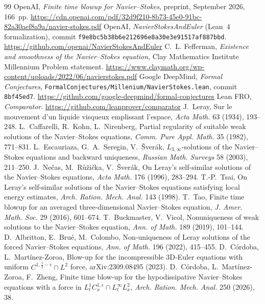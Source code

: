 \documentclass[11pt]{article}
\theoremstyle{plain}
\theoremstyle{remark}
\begin{document}
\begin{thebibliography}{99}\small
{} OpenAI, \emph{Finite time blowup for Navier--Stokes}, preprint, September 2026, 166~pp. \url{https://cdn.openai.com/pdf/32d9f210-8b73-45e0-91bc-82a30aef8a9a/navier-stokes.pdf}
 OpenAI, \emph{NavierStokesAndEuler} (Lean~4 formalization), commit \texttt{f9e8bc5b38b6e212696e8a30e3e91517af887bbd}. \url{https://github.com/openai/NavierStokesAndEuler}
 C.~L. Fefferman, \emph{Existence and smoothness of the Navier--Stokes equation}, Clay Mathematics Institute Millennium Problem statement. \url{https://www.claymath.org/wp-content/uploads/2022/06/navierstokes.pdf}
 Google DeepMind, \emph{Formal Conjectures}, \texttt{FormalConjectures/Millenium/NavierStokes.lean}, commit \texttt{8bf45ed7}. \url{https://github.com/google-deepmind/formal-conjectures}
 Lean FRO, \emph{Comparator}. \url{https://github.com/leanprover/comparator}
 J.~Leray, Sur le mouvement d'un liquide visqueux emplissant l'espace, \emph{Acta Math.} 63 (1934), 193--248.
 L.~Caffarelli, R.~Kohn, L.~Nirenberg, Partial regularity of suitable weak solutions of the Navier--Stokes equations, \emph{Comm. Pure Appl. Math.} 35 (1982), 771--831.
 L.~Escauriaza, G.~A.~Seregin, V.~\v{S}ver\'ak, $L_{3,\infty}$-solutions of the Navier--Stokes equations and backward uniqueness, \emph{Russian Math. Surveys} 58 (2003), 211--250.
 J.~Ne\v{c}as, M.~R\r{u}\v{z}i\v{c}ka, V.~\v{S}ver\'ak, On Leray's self-similar solutions of the Navier--Stokes equations, \emph{Acta Math.} 176 (1996), 283--294.
 T.-P.~Tsai, On Leray's self-similar solutions of the Navier--Stokes equations satisfying local energy estimates, \emph{Arch. Ration. Mech. Anal.} 143 (1998).
 T.~Tao, Finite time blowup for an averaged three-dimensional Navier--Stokes equation, \emph{J. Amer. Math. Soc.} 29 (2016), 601--674.
 T.~Buckmaster, V.~Vicol, Nonuniqueness of weak solutions to the Navier--Stokes equation, \emph{Ann. of Math.} 189 (2019), 101--144.
 D.~Albritton, E.~Brué, M.~Colombo, Non-uniqueness of Leray solutions of the forced Navier--Stokes equations, \emph{Ann. of Math.} 196 (2022), 415--455.
 D.~Córdoba, L.~Martínez-Zoroa, Blow-up for the incompressible 3D-Euler equations with uniform $C^{1,\frac12-\epsilon}\cap L^2$ force, arXiv:2309.08495 (2023).
 D.~Córdoba, L.~Martínez-Zoroa, F.~Zheng, Finite time blow-up for the hypodissipative Navier--Stokes equations with a force in $L^1_tC^{1,\epsilon}_x\cap L^\infty_tL^2_x$, \emph{Arch. Ration. Mech. Anal.} 250 (2026), 38.

\end{thebibliography}
\end{document}
